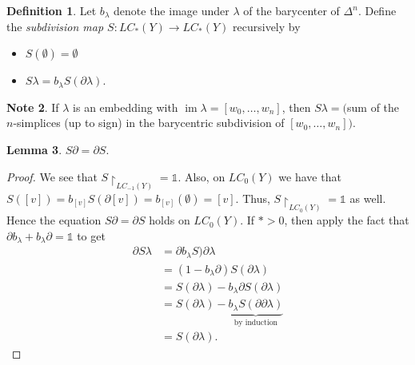 \documentclass[10pt,letterpaper,cm]{nupset}
\theoremstyle{definition}
\newtheorem{definition}{Definition}[subsection]
\newtheorem{note}[definition]{Note}
\theoremstyle{theorem}
\newtheorem{lemma}[definition]{Lemma}
\theoremstyle{remark}
\newcommand{\1}{\mathbb{1}}
\newcommand{\0}{\vec 0}
\DeclareMathOperator{\im}{im}
\begin{document}
\begin{definition}
Let $b_{\lambda}$ denote the image under $\lambda$ of the barycenter of $\Delta^n$. Define the \textit{subdivision map $S: LC_{\ast}(Y) \to LC_{\ast}(Y)$} recursively by
\begin{itemize}
\item $S(\emptyset) = \emptyset$
\item $S\lambda= b_{\lambda}{S(\partial{\lambda})}.$
\end{itemize}
\end{definition}

\begin{note}
If $\lambda$ is an embedding with $\im{\lambda} = [w_0, \ldots, w_n]$, then $S\lambda = ($sum of the $n$-simplices (up to sign) in the barycentric subdivision of $[w_0, \ldots, w_n])$.
\end{note}

\begin{lemma}
$S{\partial} = \partial{S}$.
\end{lemma}
\begin{proof}
We see that $S\restriction_{LC_{-1}(Y)} = \1$. Also, on $LC_0(Y)$ we have that $S([v]) = b_{[v]}S(\partial{[v]}) =b_{[v]}(\emptyset) =[v] .$ Thus, $S\restriction_{LC_0(Y)} =\1$ as well. Hence the equation $S{\partial} = \partial{S}$ holds on $LC_0(Y)$. If ${\ast}>0$, then apply the fact that $\partial{b_{\lambda}} + b_{\lambda}{\partial} = \1$ to get
\begin{align*}
 \partial{S\lambda} & = \partial{b_{\lambda}S)\partial{\lambda}}
 \\ & =  (1- b_{\lambda}{\partial})S(\partial{\lambda})
 \\ & = S(\partial{\lambda}) -b_{\lambda}\partial{S(\partial{\lambda})}
 \\ & = S(\partial{\lambda}) - \underbrace{b_{\lambda}S(\partial{\partial{\lambda}})}_{\text{by induction}}
 \\ & = S(\partial{\lambda}) .
\end{align*}
\end{proof}
\end{document}
